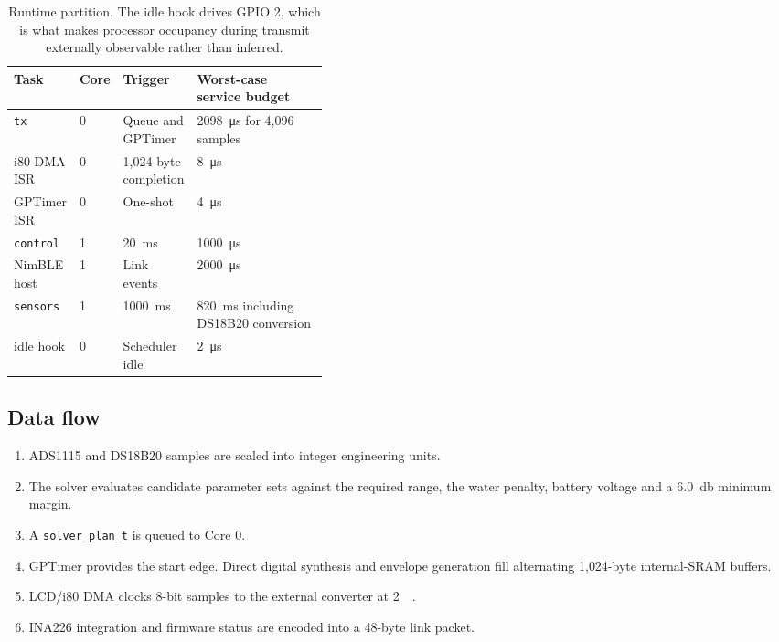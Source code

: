 \documentclass[conference,a4paper]{IEEEtran}
\begin{document}
\begin{table}[t]
\centering
\small
\begin{tabularx}{\linewidth}{L{0.13\linewidth}L{0.07\linewidth}L{0.20\linewidth}Y}
\toprule
\textbf{Task} & \textbf{Core} & \textbf{Trigger} & \textbf{Worst-case service budget} \\
\midrule
\texttt{tx} & 0 & Queue and GPTimer & \SI{2098}{\micro\second} for 4{,}096 samples \\
i80 DMA ISR & 0 & 1{,}024-byte completion & \SI{8}{\micro\second} \\
GPTimer ISR & 0 & One-shot & \SI{4}{\micro\second} \\
\texttt{control} & 1 & \SI{20}{\milli\second} & \SI{1000}{\micro\second} \\
NimBLE host & 1 & Link events & \SI{2000}{\micro\second} \\
\texttt{sensors} & 1 & \SI{1000}{\milli\second} & \SI{820}{\milli\second} including DS18B20 conversion \\
idle hook & 0 & Scheduler idle & \SI{2}{\micro\second} \\
\bottomrule
\end{tabularx}
\caption{Runtime partition. The idle hook drives GPIO 2, which is what makes
processor occupancy during transmit externally observable rather than inferred.}
\end{table}

\subsection{Data flow}

\begin{enumerate}
\item ADS1115 and DS18B20 samples are scaled into integer engineering units.
\item The solver evaluates candidate parameter sets against the required range,
      the water penalty, battery voltage and a \SI{6.0}{\decibel} minimum
      margin.
\item A \texttt{solver\_plan\_t} is queued to Core 0.
\item GPTimer provides the start edge. Direct digital synthesis and envelope
      generation fill alternating 1{,}024-byte internal-SRAM buffers.
\item LCD/i80 DMA clocks 8-bit samples to the external converter at
      \SI{2}{\mega\Sps}.
\item INA226 integration and firmware status are encoded into a 48-byte link
      packet.
\end{enumerate}
\end{document}
